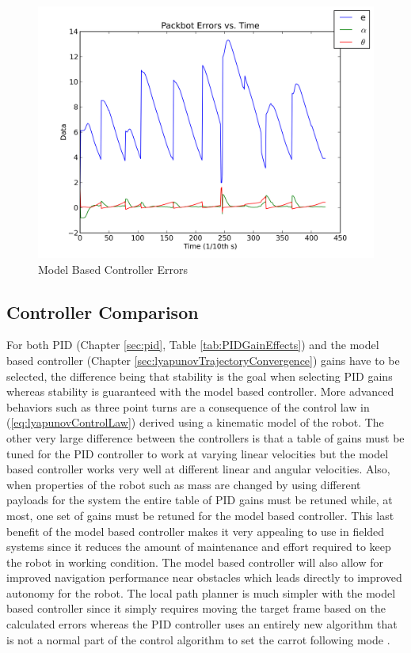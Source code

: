 \begin{figure}[ht!]
	\centering
	\includegraphics[width=.5\textwidth]{images/pbtx/20110109_1837_pbtx_simpleDriveErrors}
	\caption{Model Based Controller Errors}
	\label{fig:mbErrors}
\end{figure}

\subsection{Controller Comparison}
\label{sec:controllerComparison}
For both PID (Chapter \ref{sec:pid}, Table \ref{tab:PIDGainEffects}) and the model based controller (Chapter \ref{sec:lyapunovTrajectoryConvergence}) gains have to be selected, the difference being that stability is the goal when selecting PID gains whereas stability is guaranteed with the model based controller. More advanced behaviors such as three point turns are a consequence of the control law in (\ref{eq:lyapunovControlLaw}) derived using a kinematic model of the robot. The other very large difference between the controllers is that a table of gains must be tuned for the PID controller to work at varying linear velocities but the model based controller works very well at different linear and angular velocities. Also, when properties of the robot such as mass are changed by using different payloads for the system the entire table of PID gains must be retuned while, at most, one set of gains must be retuned for the model based controller. This last benefit of the model based controller makes it very appealing to use in fielded systems since it reduces the amount of maintenance and effort required to keep the robot in working condition. The model based controller will also allow for improved navigation performance near obstacles which leads directly to improved autonomy for the robot. The local path planner is much simpler with the model based controller since it simply requires moving the target frame based on the calculated errors whereas the PID controller uses an entirely new algorithm that is not a normal part of the control algorithm to set the carrot following mode \cite{Hogg02}.

